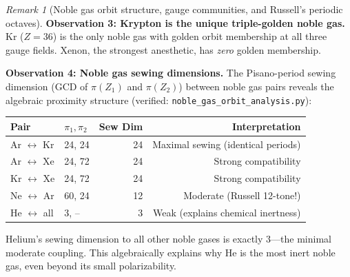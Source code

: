 \documentclass[12pt,oneside]{article}
\theoremstyle{principia}
\theoremstyle{definition}
\theoremstyle{remark}
\newtheorem{remark}[theorem]{Remark}
\begin{document}
\begin{remark}[Noble gas orbit structure, gauge communities, and Russell's periodic octaves]
\textbf{Observation 3: Krypton is the unique triple-golden noble gas.} Kr ($Z = 36$) is the only noble gas with golden orbit membership at all three gauge fields. Xenon, the strongest anesthetic, has \emph{zero} golden membership.

\textbf{Observation 4: Noble gas sewing dimensions.} The Pisano-period sewing dimension (GCD of $\pi(Z_1)$ and $\pi(Z_2)$) between noble gas pairs reveals the algebraic proximity structure (verified: \texttt{noble\_gas\_orbit\_analysis.py}):
\begin{center}
\begin{tabular}{@{}llrr@{}}
\toprule
\textbf{Pair} & $\pi_1, \pi_2$ & \textbf{Sew Dim} & \textbf{Interpretation} \\
\midrule
Ar $\leftrightarrow$ Kr & 24, 24 & 24 & Maximal sewing (identical periods) \\
Ar $\leftrightarrow$ Xe & 24, 72 & 24 & Strong compatibility \\
Kr $\leftrightarrow$ Xe & 24, 72 & 24 & Strong compatibility \\
Ne $\leftrightarrow$ Ar & 60, 24 & 12 & Moderate (Russell 12-tone!) \\
He $\leftrightarrow$ all & 3, -- & 3 & Weak (explains chemical inertness) \\
\bottomrule
\end{tabular}
\end{center}
Helium's sewing dimension to all other noble gases is exactly 3---the minimal moderate coupling. This algebraically explains why He is the most inert noble gas, even beyond its small polarizability.


\end{remark}
\end{document}
